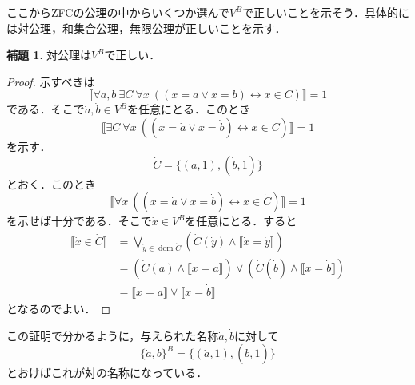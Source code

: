 \documentclass[uplatex,dvipdfmx]{jsarticle}
\newcommand{\dom}{\operatorname{dom}}
\newcommand{\truth}[1] {\llbracket #1 \rrbracket}
\theoremstyle{definition}
\newtheorem{lem}[thm]{補題}
\begin{document}
ここからZFCの公理の中からいくつか選んで$V^B$で正しいことを示そう．具体的には対公理，和集合公理，無限公理が正しいことを示す．

\begin{lem}
対公理は$V^B$で正しい．
\end{lem}
\begin{proof}
示すべきは
\[
\truth{\forall a, b\ \exists C\ \forall x\ ((x = a \lor x = b) \leftrightarrow x \in C)} = 1
\]
である．そこで$\dot{a}, \dot{b} \in V^B$を任意にとる．このとき
\[
\truth{\exists C\ \forall x\ ((x = \dot{a} \lor x = \dot{b}) \leftrightarrow x \in C)} = 1
\]
を示す．
\[
\dot{C} = \{ (\dot{a}, 1), (\dot{b}, 1) \}
\]
とおく．このとき
\[
\truth{\forall x\ ((x = \dot{a} \lor x = \dot{b}) \leftrightarrow x \in \dot{C})} = 1
\]
を示せば十分である．そこで$\dot{x} \in V^B$を任意にとる．すると
\begin{align*}
\truth{\dot{x} \in \dot{C}} &= \bigvee_{\dot{y} \in \dom \dot{C}} (\dot{C}(\dot{y}) \land \truth{\dot{x} = \dot{y}}) \\
&= (\dot{C}(\dot{a}) \land \truth{\dot{x} = \dot{a}}) \lor (\dot{C}(\dot{b}) \land \truth{\dot{x} = \dot{b}}) \\
&= \truth{\dot{x} = \dot{a}} \lor \truth{\dot{x} = \dot{b}}
\end{align*}
となるのでよい．
\end{proof}

この証明で分かるように，与えられた名称$\dot{a}, \dot{b}$に対して
\[
\{\dot{a}, \dot{b}\}^B = \{ (\dot{a}, 1), (\dot{b}, 1) \}
\]
とおけばこれが対の名称になっている．
\end{document}
